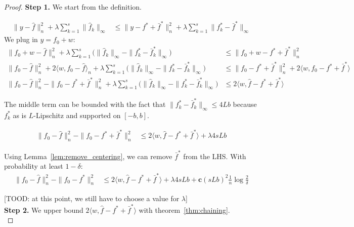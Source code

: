 \begin{proof}

\textbf{Step 1.} We start from the definition. 

\begin{align*}
\| y - \hat{f} \|_n^2 + \lambda \sum_{k=1}^s \| \hat{f}_k \|_\infty &\leq
  \| y - f^* + \bar{f}^* \|_n^2 + \lambda \sum_{k=1}^s \| f^*_k - \bar{f}^* \|_\infty 
\end{align*}
We plug in $y = f_0 + w$:
\begin{align*}
\| f_0 + w - \hat{f} \|_n^2 + \lambda \sum_{k=1}^s \Big( \| \hat{f}_k \|_\infty - 
    \| f^*_k - \bar{f}^*_k \|_\infty \Big) &\leq \|f_0 + w - f^* + \bar{f}^* \|_n^2 \\
\| f_0 - \hat{f} \|_n^2 + 2\langle w, f_0 - \hat{f} \rangle_n 
     +\lambda \sum_{k=1}^s \Big( \| \hat{f}_k \|_\infty - \|f^*_k -\bar{f}^*_k\|_\infty \Big) 
    &\leq \| f_0 - f^* + \bar{f}^* \|_n^2 + 
    2 \langle w, f_0 - f^* + \bar{f}^* \rangle \\
\|f_0 - \hat{f} \|_n^2 - \| f_0 - f^* + \bar{f}^* \|_n^2 + 
    \lambda \sum_{k=1}^s \Big( \| \hat{f}_k \|_\infty - 
 \| f^*_k - \bar{f}^*_k \|_\infty \Big) &\leq 2 \langle w, \hat{f} - f^* + \bar{f}^* \rangle
\end{align*}

The middle term can be bounded with the fact that $\|f^*_k - \bar{f}^*_k \|_\infty \leq 4Lb$ because $f^*_k$ as is $L$-Lipschitz and supported on $[-b, b]$. 

\begin{align*}
\|f_0 - \hat{f} \|_n^2 - \| f_0 - f^* + \bar{f}^* \|_n^2 
   &\leq 2 \langle w, \hat{f} - f^* + \bar{f}^* \rangle + \lambda 4 s L b 
\end{align*}

Using Lemma~\ref{lem:remove_centering}, we can remove $\bar{f}^*$ from the LHS. With probability at least $1 - \delta$:
\begin{align}
\label{eqn:first_step_inequality}
\|f_0 - \hat{f} \|_n^2 - \| f_0 - f^* \|_n^2 
   &\leq 2 \langle w, \hat{f} - f^* + \bar{f}^* \rangle + \lambda 4 s L b + \mathbf{c}(sLb)^2 \frac{1}{n} \log \frac{2}{\delta}
\end{align}

[TOOD: at this point, we still have to choose a value for $\lambda$]\\


\textbf{Step 2.} We upper bound $2 \langle w, \hat{f} - f^* + \bar{f}^* \rangle$ with theorem~\ref{thm:chaining}.\\ 


\end{proof}
